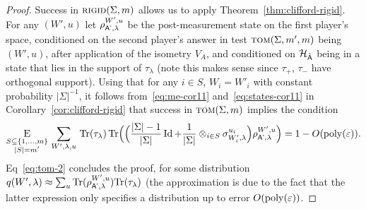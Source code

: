\begin{proof}
Success in $\textsc{rigid}(\Sigma,m)$ allows us to apply Theorem~\ref{thm:clifford-rigid}. For any $(W',u)$ let $\rho_{{\textsf{A'}},\lambda}^{W',u}$ be the post-measurement state on the first player's space, conditioned on the second player's answer  in test $\textsc{tom}(\Sigma,m',m)$ being $(W',u)$, after application of the isometry $V_A$, and conditioned on $\mathcal{H}_{\hat{{\textsf{A}}}}$ being in a state that lies in the support of $\tau_\lambda$ (note this makes sense since $\tau_+$, $\tau_-$ have orthogonal support). 
Using that for any $i\in S$, $W_i=W'_i$ with constant probability $|\Sigma|^{-1}$, 
it follows from~\eqref{eq:me-cor11} and~\eqref{eq:states-cor11} in Corollary~\ref{cor:clifford-rigid} that success in $\textsc{tom}(\Sigma,m)$ implies the condition
\begin{equation}\label{eq:tom-2}
\mathop{\textsc{E}}_{\substack{S\subseteq \{1,\ldots,m\}\\|S|=m'}}\, \sum_{W',\lambda,u}\,\mbox{\rm Tr}(\tau_\lambda)  \,\mbox{\rm Tr}\Big(\Big( \frac{|\Sigma|-1}{|\Sigma|}\mathop{\rm Id}\nolimits + \frac{1}{|\Sigma|}\otimes_{i\in S}\sigma_{W'_i,\lambda}^{u_i} \Big) \rho_{{\textsf{A'}},\lambda}^{W',u}\Big)  = 1- O(\operatorname{poly}(\varepsilon)). 
\end{equation}
Eq~\eqref{eq:tom-2} concludes the proof, for some distribution $q(W',\lambda) \approx \sum_u \mbox{\rm Tr}(\rho_{{\textsf{A'}},\lambda}^{W',u})\mbox{\rm Tr}(\tau_\lambda)$ (the approximation is due to the fact that the latter expression only specifies a distribution up to error $O(\operatorname{poly}(\varepsilon))$.
\end{proof}


